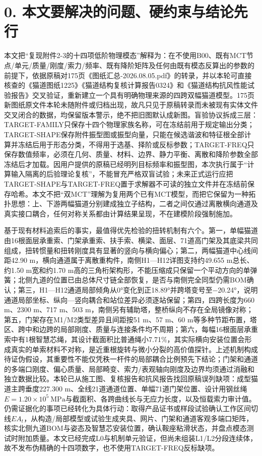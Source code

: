 \documentclass[UTF8,a4paper,11pt,fontset=none]{ctexart}
\begin{document}
\section*{0. 本文要解决的问题、硬约束与结论先行}
本文把“复现附件2-3的十四项低阶物理模态”解释为：在不使用B00、既有MCT节点/单元/质量/刚度/索力/频率、既有降阶矩阵及任何由既有模态反算出的参数的前提下，依据原稿对175页《图纸汇总-2026.08.05.pdf》的转录，并以本轮可直接核查的《猫道图纸1225》《猫道结构复核计算报告0324》和《猫道结构抗风性能试验报告》交叉验证，重新建立一个具有明确物理来源的四跨双幅猫道模型。175页新图纸原文件本轮未随附件或归档出现，故凡只见于原稿转录而未被现有实体文件交叉闭合的数据，均保留版本警示，绝不把旧图默认成新图。盲验协议拆成三层：TARGET-FAMILY只保存十四个物理家族名称，可在冻结前用于规定输出分类；TARGET-SHAPE保存附件振型图或振型向量，只能在候选谐波和特征根全部计算并冻结后用于形态分类，不得用于选基、择阶或反标参数；TARGET-FREQ只保存数值频率，必须在几何、质量、材料、边界、静力平衡、离散和降阶参数全部冻结后才加载。因用户提供的原稿已经明列目标频率和振型图，本次执行属于“计算输入隔离的后验理论复核”，不能冒充严格双盲试验；未来正式运行应把TARGET-SHAPE与TARGET-FREQ置于求解器不可读的独立文件并在冻结前保存哈希。本文不把“双MCT”理解为复用两个已有MCT模型，而把它保留为一种拓扑思想：上、下游两幅猫道分别建成独立子结构，二者之间仅通过离散横向通道及真实接口耦合，任何对称关系都由计算结果呈现，不在建模阶段强制施加。\par
基于现有材料追索后的事实，最值得优先检验的扭转机制有六个。第一，单幅猫道由16根面层承重索、门架承重索、扶手索、横梁、面层、71道高门架及其底梁共同组成，扭转惯量和扭转刚度具有显著的竖向与横向偏心；第二，两幅猫道中心线间距42.90 m，横向通道属于离散重构件，南侧H1—H12详图支持约49.655 m总长、约1.50 m宽和约1.70 m高的三角桁架构形，不能压缩成只保留一个平动方向的单弹簧；北侧九道的位置已由总体尺寸链全部恢复，是否与南侧完全同型仍需BOM确认；第三，H1—H12通道局部倾角从0°变化到正18.89°并跨塔变号至−20.24°，说明通道局部坐标、纵向—竖向耦合和站位差异必须逐站保留；第四，四跨长度为660 m、2300 m、717 m、503 m，南侧另有辅助塔，整桥纵向不存在全局镜像对称；第五，门架存在M1/M2类型差异且间距按51 m、57 m、60 m等多种节距布置，塔区、跨中和边跨的局部刚度、质量与连接条件均不周期；第六，每幅16根面层承重索中有1根智慧芯绳，其设计截面积比普通绳小7.71\%，其实际横向安装位置会形成真实的单索材料不对称，是近重根旋转与微小分裂的高价值探针。上述机制构成待证伪假设，其重要性不能仅凭秩一杆件的局部耦合比例预先下结论；门架和通道的多端口刚度、偏心质量、局部畸变、索力/表观轴向刚度及边界均须通过消融和独立数据比较。本轮已从施工图、复核报告和抗风报告找回原稿误列缺项：成型猫道主跨垂度227.300 m、全线21道通道位置、单幅71道门架位置、设计用钢丝绳\(E=1.20\times10^5\ \mathrm{MPa}\)\allowbreak{}与截面积、各跨曲线长与无应力长度，以及恒载索力审计值。仍需证据化的事项已经转化为具体行动：取得产品证书或样段试验确认工作区间切线\(EA_t\)\allowbreak{}，从构造/局部模型或试验生成夹具、网片、门架和通道客观多端口矩阵，核实北侧九道BOM与姿态及智慧芯安装位置，确认鞍座粘滑状态，并盘点模态测试时附加质量。本文已经完成L0与机制单元验证，但尚未组装L1/L2分段连续体，故不发布伪精确的十四项数字，也不使用TARGET-FREQ反标缺项。\par
\end{document}
